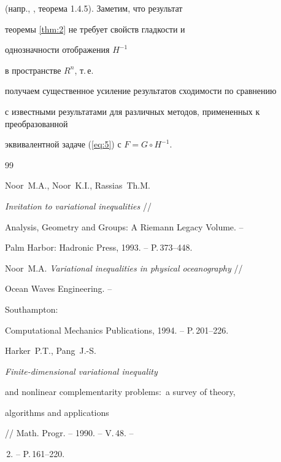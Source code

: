 (напр., \cite{Kon01}, теорема 1.4.5). Заметим, что результат 


теоремы \ref{thm:2} не требует свойств гладкости и


однозначности отображения $H^{-1}$


в пространстве $R^{n}$, т.\,е. 


получаем существенное усиление результатов сходимости по сравнению 


с известными результатами для различных методов, примененных к преобразованной 


эквивалентной задаче (\ref{eq:5}) с $F=G\circ H^{-1} $.








\begin{thebibliography}{99}







Noor~M.A., Noor~K.I., Rassias~Th.M. 


{\em Invitation to variational inequalities} //


Analysis, Geometry and Groups: A Riemann Legacy Volume. --




Palm Harbor: Hadronic Press, 1993. -- P.\,373--448.







Noor~M.A. {\em Variational inequalities in physical oceanography} // 


Ocean Waves Engineering. --




Southampton: 


Computational Mechanics Publications, 1994. -- P.\,201--226.







Harker~P.T., Pang~J.-S. {\em Finite-dimensional variational inequality 


and nonlinear complementarity problems$:$ a survey of theory, 


algorithms and applications} // Math. Progr. -- 1990. -- V.\,48. --


\No\,2.  -- P.\,161--220.






\end{thebibliography}
